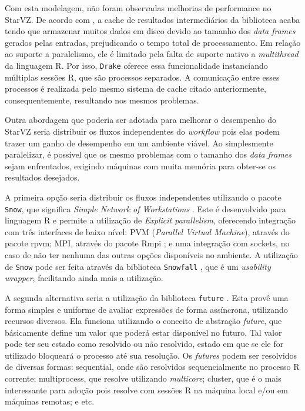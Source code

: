 Com esta modelagem, não foram observadas melhorias de performance no StarVZ. De 
acordo com \citet{ref:drakestarvz},
a cache de resultados intermediários da biblioteca acaba tendo que armazenar 
muitos dados em disco devido
ao tamanho dos \emph{data frames} gerados pelas entradas, prejudicando o tempo 
total de processamento.
Em relação ao suporte a paralelismo, ele é limitado pela falta de suporte 
nativo 
a \emph{multithread} da linguagem R.
Por isso, \texttt{Drake} oferece essa funcionalidade instanciando múltiplas 
sessões R, que são processos separados. A comunicação
entre esses processos é realizada pelo mesmo sistema de cache citado 
anteriormente, consequentemente, resultando nos mesmos
problemas.

Outra abordagem que poderia ser adotada para melhorar o desempenho do StarVZ 
seria distribuir os fluxos independentes
do \emph{workflow} pois elas podem trazer um ganho de desempenho em um ambiente 
viável.
Ao simplesmente paralelizar, é possível que os mesmo problemas com o tamanho 
dos 
\emph{data frames} sejam enfrentados, exigindo
máquinas com muita memória para obter-se os resultados desejados. 

A primeira opção seria distribuir os fluxos independentes utilizando o pacote 
\texttt{Snow}, que significa 
\emph{Simple Network of Workstations} \cite{ref:snow}. Este é desenvolvido para 
linguagem R e permite a utilização
de \emph{Explicit parallelism}, oferecendo integração com três interfaces de 
baixo nível: PVM (\emph{Parallel Virtual Machine}), através do pacote rpvm; 
MPI, 
através do pacote Rmpi \cite{ref:rmpi}; e uma integração com sockets, no caso 
de 
não ter nenhuma das outras 
opções disponíveis no ambiente. A utilização de \texttt{Snow} pode ser feita 
através da biblioteca \texttt{Snowfall} \cite{ref:snowfall},
que é um \emph{usability wrapper}, facilitando ainda mais a utilização.

A segunda alternativa seria a utilização da biblioteca \texttt{future} 
\cite{ref:future}. Esta provê uma forma simples e uniforme 
de avaliar expressões de forma assíncrona, utilizando recursos diversos. Ela 
funciona utilizando o conceito de abstração 
\emph{future}, que básicamente define um valor que poderá estar disponível no 
futuro. Tal valor pode ter seu estado como 
resolvido ou não resolvido, estado em que se ele for utilizado bloqueará o 
processo até sua resolução. Os \emph{futures} 
podem ser resolvidos de diversas formas: sequential, onde são resolvidos 
sequencialmente no processo R corrente; multiprocess,
que resolve utilizando \emph{multicore}; cluster, que é o mais interessante 
para 
adoção pois resolve com sessões R na máquina 
local e/ou em máquinas remotas; e etc.

